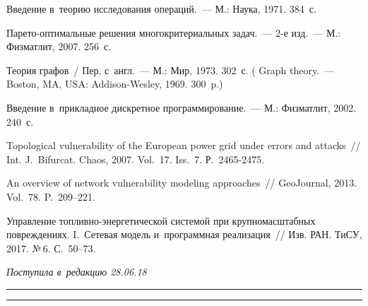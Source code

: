 \begin{multicols}{2}
{{\begin{thebibliography}{99}
 Введение в~теорию исследования операций.~--- 
М.: Наука, 1971. 384~с.

Па\-ре\-то-оп\-ти\-маль\-ные решения многокритериальных задач.~--- 2-е изд.~--- 
М.: Физматлит, 2007.  256~с.

 Теория графов~/ Пер. с~англ.~--- М.: Мир, 1973. 302~с. 
( Graph theory.~--- Boston, MA, USA: Addison-Wesley, 1969. 300~p.)
\columnbreak

 Введение в~прикладное дискретное программирование.~--- 
М.: Физматлит, 2002. 240~с.

 Topological vulnerability of the European power grid under errors and attacks~// 
 Int. J.~Bifurcat. Chaos, 2007. Vol.~17. Iss.~7. 
 Р.~2465-2475.

 An overview of network vulnerability modeling approaches~// 
GeoJournal, 2013. Vol.~78. P.~209--221.

Управление   топ\-лив\-но-энер\-ге\-ти\-че\-ской  сис\-те\-мой  
при  круп\-но\-масш\-таб\-ных по\-вреж\-де\-ни\-ях. I.~Сетевая  модель  и~программная реализация~// 
Изв. РАН. ТиСУ, 2017. №\,6. С.~50--73.

 \end{thebibliography}

 }
 }

\end{multicols}

\vspace*{-5pt}

\hfill{\small\textit{Поступила в~редакцию 28.06.18}}

\vspace*{6pt}



\hrule

\vspace*{2pt}

\hrule

\vspace*{-6pt}


\def\tit{ANALYSIS OF CUTTING DAMAGES TO~MULTIPOLAR NETWORKS\\[-5pt]}

